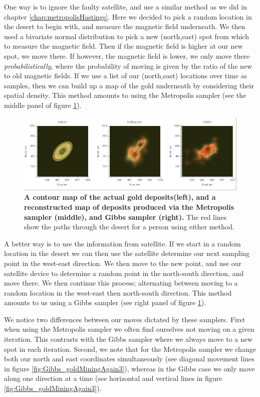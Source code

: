\documentclass[11pt,fullpage]{book}
\begin{document}
One way is to ignore the faulty satellite, and use a similar method as we did in chapter \ref{chap:metropolisHastings}. Here we decided to pick a random location in the desert to begin with, and measure the magnetic field underneath. We then used a bivariate normal distribution to pick a new (north,east) spot from which to measure the magnetic field. Then if the magnetic field is higher at our new spot, we move there. If however, the magnetic field is lower, we only move there \textit{probabilistically}, where the probability of moving is given by the ratio of the new to old magnetic fields. If we use a list of our (north,east) locations over time as samples, then we can build up a map of the gold underneath by considering their spatial density. This method amounts to using the Metropolis sampler (see the middle panel of figure \ref{fig:Gibbs_goldMiningAgain2}).

\begin{figure}
\centerline{\includegraphics[width=1\textwidth]{Gibbs_goldMiningAgain2.png}}
\caption{\textbf{A contour map of the actual gold deposits(left), and a reconstructed map of deposits produced via the Metropolis sampler (middle), and Gibbs sampler (right).} The red lines show the paths through the desert for a person using either method.}\label{fig:Gibbs_goldMiningAgain2}
\end{figure}

A better way is to use the information from satellite. If we start in a random location in the desert we can then use the satellite determine our next sampling point in the west-east direction. We then move to the new point, and use our satellite device to determine a random point in the north-south direction, and move there. We then continue this process; alternating between moving to a random location in the west-east then north-south direction. This method amounts to us using a Gibbs sampler (see right panel of figure \ref{fig:Gibbs_goldMiningAgain2}).

We notice two differences between our moves dictated by these samplers. First when using the Metropolis sampler we often find ourselves not moving on a given iteration. This contrasts with the Gibbs sampler where we always move to a new spot in each iteration. Second, we note that for the Metropolis sampler we change both our north and east coordinates simultaneously (see diagonal movement lines in figure \ref{fig:Gibbs_goldMiningAgain3}), whereas in the Gibbs case we only move along one direction at a time (see horizontal and vertical lines in figure \ref{fig:Gibbs_goldMiningAgain3}).
\end{document}
